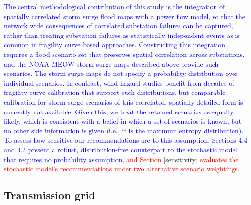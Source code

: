 \documentclass[authoryear,preprint,review,12pt]{elsarticle}\usepackage{amssymb}
\begin{document}
\textcolor{blue}{The central methodological contribution of this study is the integration of spatially correlated storm surge flood maps with a power flow model, so that the network wide consequences of correlated substation failures can be captured, rather than treating substation failures as statistically independent events as is common in fragility curve based approaches. Constructing this integration requires a flood scenario set that preserves spatial correlation across substations, and the NOAA MEOW storm surge maps described above provide such scenarios. The storm surge maps do not specify a probability distribution over individual scenarios. In contrast, wind hazard studies benefit from decades of fragility curve calibration that support such distributions, but comparable calibration for storm surge scenarios of this correlated, spatially detailed form is currently not available. 
Given this, we treat the retained scenarios as equally likely, which is consistent with a belief in which a set of scenarios is known, but no other side information is given (i.e., it is the maximum entropy distribution).  
To assess how sensitive our recommendations are to this assumption, Sections 4.4 and 6.2 present a robust, distribution-free counterpart to the stochastic model that requires no probability assumption\textcolor{red}{, and Section \ref{sensitivity} evaluates the stochastic model's recommendations under two alternative scenario weightings}.}

\subsection{Transmission grid}
\end{document}
